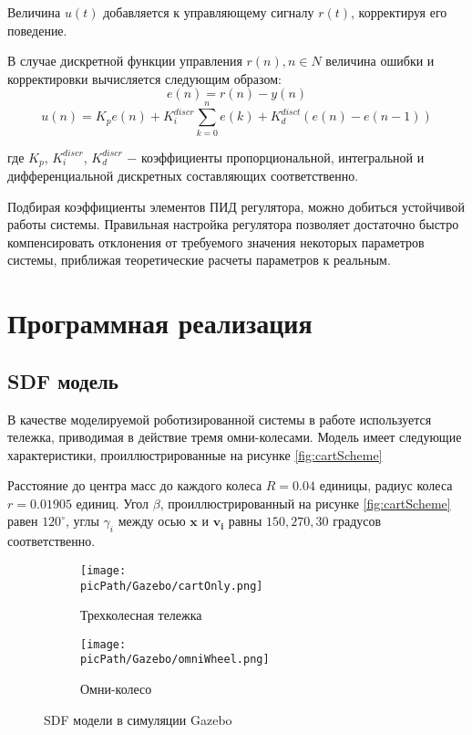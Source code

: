 \documentclass[oneside,final,14pt]{extreport}
\newcommand{\picPath}{img}
\newcommand{\bs}{\boldsymbol}
\begin{document}
Величина $u(t)$ добавляется к управляющему сигналу $r(t)$, корректируя его поведение. 

В случае дискретной функции управления $r(n), n \in N$ величина ошибки и корректировки вычисляется следующим образом:
\begin{equation}
\label{Equation:discretError}
e(n) 
=
r(n)
-
y(n)
\end{equation}
\begin{equation}
u(n)
=
K_p e(n)
+
K_i^{discr} \sum\limits_{k=0}^n e(k)
+
K_d^{disct} (e(n) - e(n-1)) 
\end{equation}

где $K_p$, $K_i^{discr}$, $K_d^{discr}$ $-$ коэффициенты  пропорциональной, интегральной и дифференциальной дискретных составляющих соответственно.

Подбирая коэффициенты элементов ПИД регулятора, можно добиться устойчивой работы системы. Правильная настройка регулятора позволяет достаточно быстро компенсировать  отклонения от требуемого значения некоторых параметров системы, приближая теоретические расчеты  параметров к реальным. 

\chapter{Программная реализация}
\section{ SDF модель }
\label{chap:SDFCartModel}

В качестве моделируемой роботизированной системы в работе используется тележка, приводимая в действие тремя омни-колесами. 
Модель имеет следующие характеристики, проиллюстрированные на рисунке \ref{fig:cartScheme}
\begin{figure}[H]
\end{figure}

Расстояние до центра масс до каждого колеса $R = 0.04$ единицы, радиус колеса $r = 0.01905$ единиц. Угол $\beta$, проиллюстрированный на рисунке \ref{fig:cartScheme} равен $120^{\circ}$, углы $\gamma_i$ между осью $\bs{x}$ и $\bs{v_i}$ равны $150, 270, 30$ градусов соответственно.


\begin{figure}[H]
  \centering
  \begin{subfigure}[b]{0.4\linewidth}
   \texttt{[image: \\picPath/Gazebo/cartOnly.png]}
    \caption{ Трехколесная тележка }
  \end{subfigure}
  \begin{subfigure}[b]{0.4\linewidth}
    \texttt{[image: \\picPath/Gazebo/omniWheel.png]}
    \caption{ Омни-колесо}
  \end{subfigure}
  \caption{ SDF модели в симуляции Gazebo}
  \label{Figure:gazeboModels}
\end{figure}
\end{document}
